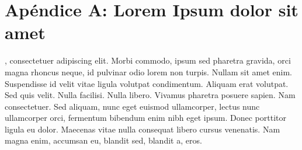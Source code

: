 \chapter*{Apéndice A: Lorem Ipsum dolor sit amet}
\label{apendiceA}

, consectetuer adipiscing elit. Morbi commodo, ipsum sed pharetra gravida, orci magna rhoncus neque, id pulvinar odio lorem non turpis. Nullam sit amet enim. Suspendisse id velit vitae ligula volutpat condimentum. Aliquam erat volutpat. Sed quis velit. Nulla facilisi. Nulla libero. Vivamus pharetra posuere sapien. Nam consectetuer. Sed aliquam, nunc eget euismod ullamcorper, lectus nunc ullamcorper orci, fermentum bibendum enim nibh eget ipsum. Donec porttitor ligula eu dolor. Maecenas vitae nulla consequat libero cursus venenatis. Nam magna enim, accumsan eu, blandit sed, blandit a, eros.
